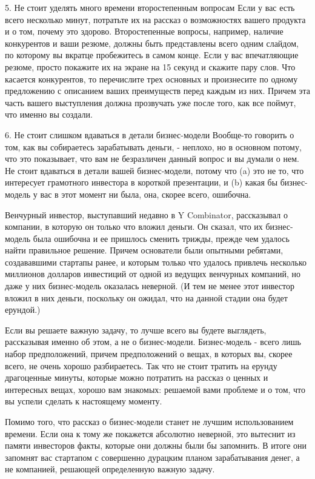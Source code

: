 \documentclass[ebook,12pt,oneside,openany]{memoir}
\begin{document}
5. Не стоит уделять много времени второстепенным вопросам Если у вас
есть всего несколько минут, потратьте их на рассказ о возможностях
вашего продукта и о том, почему это здорово. Второстепенные вопросы,
например, наличие конкурентов и ваши резюме, должны быть представлены
всего одним слайдом, по которому вы вкратце пробежитесь в самом конце.
Если у вас впечатляющие резюме, просто покажите их на экране на 15
секунд и скажите пару слов. Что касается конкурентов, то перечислите
трех основных и произнесите по одному предложению с описанием ваших
преимуществ перед каждым из них. Причем эта часть вашего выступления
должна прозвучать уже после того, как все поймут, что именно вы
создали.

6. Не стоит слишком вдаваться в детали бизнес-модели Вообще-то
говорить о том, как вы собираетесь зарабатывать деньги, - неплохо, но
в основном потому, что это показывает, что вам не безразличен данный
вопрос и вы думали о нем. Не стоит вдаваться в детали вашей
бизнес-модели, потому что (a) это не то, что интересует грамотного
инвестора в короткой презентации, и (b) какая бы бизнес-модель у вас в
этот момент ни была, она, скорее всего, ошибочна.

Венчурный инвестор, выступавший недавно в Y Combinator, рассказывал о
компании, в которую он только что вложил деньги. Он сказал, что их
бизнес-модель была ошибочна и ее пришлось сменить трижды, прежде чем
удалось найти правильное решение. Причем основатели были опытными
ребятами, создававшими стартапы ранее, и которым только что удалось
привлечь несколько миллионов долларов инвестиций от одной из ведущих
венчурных компаний, но даже у них бизнес-модель оказалась неверной. (И
тем не менее этот инвестор вложил в них деньги, поскольку он ожидал,
что на данной стадии она будет ерундой.)

Если вы решаете важную задачу, то лучше всего вы будете выглядеть,
рассказывая именно об этом, а не о бизнес-модели. Бизнес-модель -
всего лишь набор предположений, причем предположений о вещах, в
которых вы, скорее всего, не очень хорошо разбираетесь. Так что не
стоит тратить на ерунду драгоценные минуты, которые можно потратить на
рассказ о ценных и интересных вещах, хорошо вам знакомых: решаемой
вами проблеме и о том, что вы успели сделать к настоящему моменту.

Помимо того, что рассказ о бизнес-модели станет не лучшим
использованием времени. Если она к тому же покажется абсолютно
неверной, это вытеснит из памяти инвесторов факты, которые они должны
были бы запомнить. В итоге они запомнят вас стартапом с совершенно
дурацким планом зарабатывания денег, а не компанией, решающей
определенную важную задачу.
\end{document}
